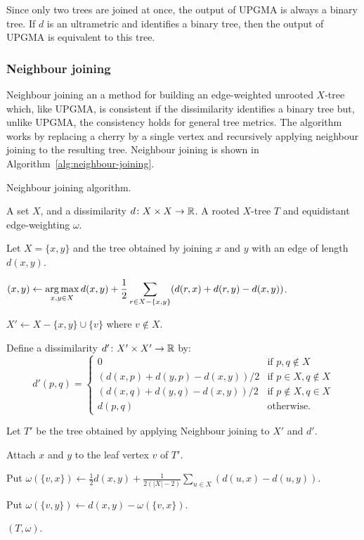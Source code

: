Since only two trees are joined at once, the output of UPGMA is always a
binary tree.  If $d$ is an ultrametric and identifies a binary tree, then the
output of UPGMA is equivalent to this tree.

\subsubsection{Neighbour joining}
\label{sec:neighbour-joining}

Neighbour joining an a method for building an edge-weighted unrooted $X$-tree
which, like UPGMA, is consistent if the dissimilarity identifies a binary
tree but, unlike UPGMA, the consistency holds for general tree metrics.  The
algorithm works by replacing a cherry by a single vertex and recursively
applying neighbour joining to the resulting tree.  Neighbour joining is shown
in Algorithm~\ref{alg:neighbour-joining}.

\begin{algorithm}[h]
  \caption{Neighbour joining algorithm.}
  \label{alg:neighbour-joining}

  \begin{algorithmic}
    \Require A set $X$, and a dissimilarity $d \colon X \times X \to {\mathbb R}$.
    \Ensure  A rooted $X$-tree $T$ and equidistant edge-weighting $\omega$.

     Let $X = \{x,y\}$ and \Return the tree obtained by joining
    $x$ and $y$ with an edge of length $d(x,y)$.
    \EndIf

    \State $\displaystyle (x,y) \gets \operatorname*{arg\,max}_{x,y \in X} d(x,y) + \frac{1}{2}
    \sum_{r \in X - \{x,y\}} (d(r,x)+d(r,y)-d(x,y))$.

    \State $X' \gets X - \{x,y\} \cup \{v\}$ where $v \notin X$.

    \State Define a dissimilarity $d' \colon X' \times X' \to {\mathbb R}$ by:
    \begin{equation*}
      d'(p,q) =
      \begin{cases}
        0 & \text{if $p,q \notin X$} \\
        (d(x,p)+d(y,p)-d(x,y))/2 & \text{if $p \in X, q \notin X$} \\
        (d(x,q)+d(y,q)-d(x,y))/2 & \text{if $p \notin X, q \in X$} \\
        d(p,q) & \text{otherwise.}
      \end{cases}
    \end{equation*}

    \State Let $T'$ be the tree obtained by applying Neighbour joining to $X'$
    and $d'$.

    \State Attach $x$ and $y$ to the leaf vertex $v$ of $T'$.

    \State Put $\displaystyle \omega(\{v,x\}) \gets \frac{1}{2} d(x,y) +
    \frac{1}{2(|X|-2)} \sum_{u \in X} (d(u,x)-d(u,y))$.

    \State Put $\omega(\{v,y\}) \gets d(x,y) - \omega(\{v,x\})$.

    \State \Return $(T,\omega)$.
  \end{algorithmic}
\end{algorithm}

